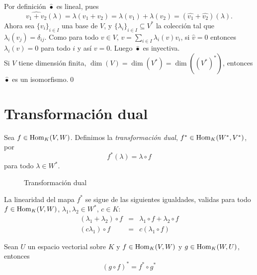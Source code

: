 \dem Por definici\'on $\widehat{\bullet}$ es lineal, pues 
\[
\widehat{v_1+v_2}(\lambda)=\lambda(v_1+v_2)=\lambda(v_1)+\lambda(v_2)=\left(\widehat{v_1}+\widehat{v_2}\right)(\lambda).
\]
Ahora sea $\{v_i\}_{i\in I}$ una base de $V$, y $\{\lambda_i\}_{i\in I}\subseteq V^*$ la colecci\'on tal que $\lambda_i(v_j)=\delta_{ij}$. Como para todo $v\in V$, $v=\sum_{i\in I}\lambda_i(v)v_i$, si $\widehat{v}=0$ entonces $\lambda_i(v)=0$ para todo $i$ y as\'i $v=0$. Luego $\widehat{\bullet}$ es inyectiva.\\
Si $V$ tiene dimensi\'on finita, $\dim(V)=\dim(V^*)=\dim\left(\left(V^*\right)^*\right)$, entonces $\widehat{\bullet}$ es un isomorfismo.\qed

\section{Transformaci\'on dual}

\begin{defn}
Sea $f\in\operatorname{Hom}_K(V,W)$. Definimos la \emph{transformaci\'on dual}, $f^*\in\operatorname{Hom}_K(W^*,V^*)$, por
\[
f^*(\lambda)=\lambda\circ f
\]
para todo $\lambda\in W^*$.
\end{defn}

\begin{figure}[!hbp]
\centering
{}
\caption{Transformaci\'on dual}
\label{trdual}
\end{figure}

\begin{obs}
La linearidad del mapa $f^*$ se sigue de las siguientes igualdades, validas para todo $f\in\operatorname{Hom}_K(V,W)$, $\lambda_1,\lambda_2\in W^*$, $c\in K$:
\begin{eqnarray*}
(\lambda_1+\lambda_2)\circ f & = & \lambda_1\circ f+\lambda_2\circ f\\
(c\lambda_1)\circ f & = & c(\lambda_1\circ f)
\end{eqnarray*}
\end{obs}

\begin{pro}
Sean $U$ un espacio vectorial sobre $K$ y $f\in\operatorname{Hom}_K(V,W)$ y $g\in\operatorname{Hom}_K(W,U)$, entonces
\[
(g\circ f)^*=f^*\circ g^*
\]
\end{pro}


